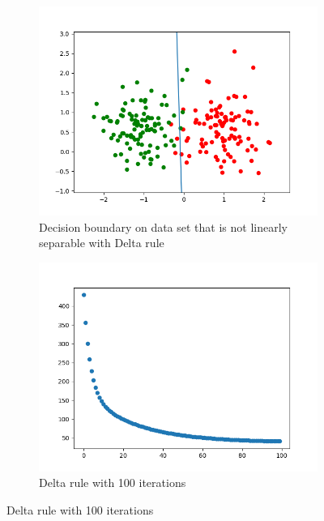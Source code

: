 \documentclass[a4paper]{article}
\begin{document}
\begin{figure}[htb]
    \centering
    \begin{subfigure}{0.4\textwidth}
        \includegraphics[width=\textwidth]{Labs/Lab 1/Lab 1a/Results/decicion-boundary-not-separable.png}
        \caption{Decision boundary on data set that is not linearly separable with Delta rule}
        \label{fig:Decision-boundary-not-linearly-separable}
    \end{subfigure}
    \hfill
    \begin{subfigure}{0.4\textwidth}
        \includegraphics[width=\textwidth]{Labs/Lab 1/Lab 1a/Results/error-convergance.png}
        \caption{Delta rule with 100 iterations}
        \label{fig:Error-convergance}
    \end{subfigure}
\end{figure}
\end{document}
